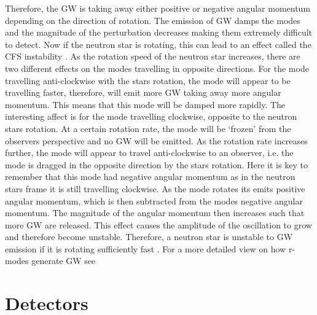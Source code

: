 Therefore, the \ac{GW} is taking away either positive or negative angular momentum depending on the direction of rotation.
The emission of \ac{GW} damps the modes and the magnitude of the perturbation decreases making them extremely difficult to detect.
Now if the neutron star is rotating, this can lead to an effect called the \ac{CFS} instability  \citep{chandrasekhar1970SolutionsTwo,friedman1978SecularInstability}. 
As the rotation speed of the neutron star increases, there are two different effects on the modes travelling in opposite directions. 
For the mode travelling anti-clockwise with the stars rotation, the mode will appear to be travelling faster, therefore, will emit more \ac{GW} taking away more angular momentum. This means that this mode will be damped more rapidly.
The interesting affect is for the mode travelling clockwise, opposite to the neutron stars rotation. 
At a certain rotation rate, the mode will be `frozen' from the observers perspective and no \ac{GW} will be emitted.
As the rotation rate increases further, the mode will appear to travel anti-clockwise to an observer, i.e. the mode is dragged in the opposite direction by the stars rotation. 
Here it is key to remember that this mode had negative angular momentum as in the neutron stars frame it is still travelling clockwise.
As the mode rotates its emits positive angular momentum, which is then subtracted from the modes negative angular momentum.
The magnitude of the angular momentum then increases such that more \ac{GW} are released.
This effect causes the amplitude of the oscillation to grow and therefore become unstable.
Therefore, a neutron star is unstable to \ac{GW} emission if it is rotating sufficiently fast \citep{lasky2015GravitationalWaves}.
For a more detailed view on how r-modes generate \ac{GW} see \citep{owen1998GravitationalWaves,jonesCFSInstability}


\section{\label{intro:detector}Detectors}

